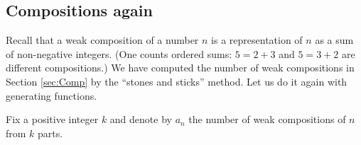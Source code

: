 \subsection{Compositions again}
Recall that a weak composition of a number $n$ is a representation of $n$ as a sum of non-negative integers.
(One counts ordered sums: $5 = 2 + 3$ and $5 = 3 + 2$ are different compositions.)
We have computed the number of weak compositions in Section \ref{sec:Comp} by the ``stones and sticks'' method.
Let us do it again with generating functions.

Fix a positive integer $k$ and denote by $a_n$ the number of weak compositions of $n$ from $k$ parts.